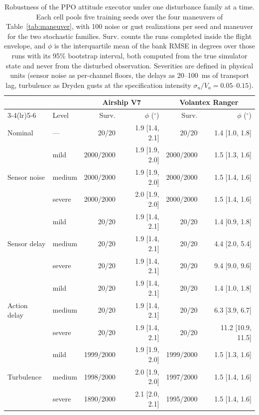 \begin{table}[t]
\caption{Robustness of the PPO attitude executor under one disturbance family at a time. Each cell pools five training seeds over the four maneuvers of Table~\ref{tab:maneuver}, with 100 noise or gust realizations per seed and maneuver for the two stochastic families. Surv. counts the runs completed inside the flight envelope, and $\phi$ is the interquartile mean of the bank RMSE in degrees over those runs with its 95\% bootstrap interval, both computed from the true simulator state and never from the disturbed observation. Severities are defined in physical units (sensor noise as per-channel floors, the delays as 20--100~ms of transport lag, turbulence as Dryden gusts at the specification intensity $\sigma_u/V_a = 0.05$--$0.15$).}
\label{tab:robustness}
\centering
\setlength{\tabcolsep}{3pt}
\begin{tabular}{llrrrr}
\toprule
& & \multicolumn{2}{c}{Airship V7} & \multicolumn{2}{c}{Volantex Ranger} \\
\cmidrule(lr){3-4}\cmidrule(lr){5-6}
& Level & Surv. & $\phi$ ($^\circ$) & Surv. & $\phi$ ($^\circ$) \\
\midrule
Nominal & --- & 20/20 & 1.9 [1.4, 2.1] & 20/20 & 1.4 [1.0, 1.8] \\
\midrule
\multirow{3}{*}{Sensor noise} & mild & 2000/2000 & 1.9 [1.9, 2.0] & 2000/2000 & 1.5 [1.3, 1.6] \\
 & medium & 2000/2000 & 1.9 [1.9, 2.0] & 2000/2000 & 1.5 [1.4, 1.6] \\
 & severe & 2000/2000 & 2.0 [1.9, 2.0] & 2000/2000 & 1.5 [1.4, 1.6] \\
\midrule
\multirow{3}{*}{Sensor delay} & mild & 20/20 & 1.9 [1.4, 2.1] & 20/20 & 1.4 [0.9, 1.8] \\
 & medium & 20/20 & 1.9 [1.4, 2.1] & 20/20 & 4.4 [2.0, 5.4] \\
 & severe & 20/20 & 1.9 [1.4, 2.1] & 20/20 & 9.4 [9.0, 9.6] \\
\midrule
\multirow{3}{*}{Action delay} & mild & 20/20 & 1.9 [1.4, 2.1] & 20/20 & 1.4 [1.0, 1.8] \\
 & medium & 20/20 & 1.9 [1.4, 2.1] & 20/20 & 6.3 [3.9, 6.7] \\
 & severe & 20/20 & 1.9 [1.4, 2.1] & 20/20 & 11.2 [10.9, 11.5] \\
\midrule
\multirow{3}{*}{Turbulence} & mild & 1999/2000 & 1.9 [1.9, 2.0] & 1999/2000 & 1.5 [1.3, 1.6] \\
 & medium & 1998/2000 & 2.0 [1.9, 2.0] & 1997/2000 & 1.5 [1.4, 1.6] \\
 & severe & 1890/2000 & 2.1 [2.0, 2.1] & 1995/2000 & 1.5 [1.4, 1.6] \\
\bottomrule
\end{tabular}
\end{table}
